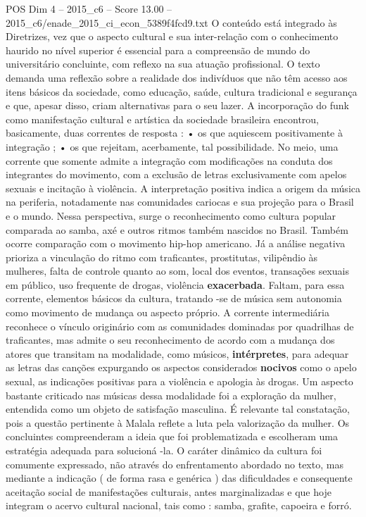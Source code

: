 \begin{textsample}{POS Dim 4 – 2015\_c6 – Score 13.00 – 2015\_c6/enade\_2015\_ci\_econ\_5389f4fcd9.txt}
O conteúdo está integrado às Diretrizes, vez que o aspecto cultural e sua inter-relação com o conhecimento haurido no nível superior é essencial para a compreensão de mundo do universitário concluinte, com reflexo na sua atuação profissional.
O texto demanda uma reflexão sobre a realidade dos indivíduos que não têm acesso aos itens básicos da sociedade, como educação, saúde, cultura tradicional e segurança e que, apesar disso, criam alternativas para o seu lazer.
A incorporação do funk como manifestação cultural e artística da sociedade brasileira encontrou, basicamente, duas correntes de resposta : • os que aquiescem positivamente à integração ; • os que rejeitam, acerbamente, tal possibilidade.
No meio, uma corrente que somente admite a integração com modificações na conduta dos integrantes do movimento, com a exclusão de letras exclusivamente com apelos sexuais e incitação à violência.
A interpretação positiva indica a origem da música na periferia, notadamente nas comunidades cariocas e sua projeção para o Brasil e o mundo.
Nessa perspectiva, surge o reconhecimento como cultura popular comparada ao samba, axé e outros ritmos também nascidos no Brasil.
Também ocorre comparação com o movimento hip-hop americano.
Já a análise negativa prioriza a vinculação do ritmo com traficantes, prostitutas, vilipêndio às mulheres, falta de controle quanto ao som, local dos eventos, transações sexuais em público, uso frequente de drogas, violência \textbf{exacerbada}.
Faltam, para essa corrente, elementos básicos da cultura, tratando -se de música sem autonomia como movimento de mudança ou aspecto próprio.
A corrente intermediária reconhece o vínculo originário com as comunidades dominadas por quadrilhas de traficantes, mas admite o seu reconhecimento de acordo com a mudança dos atores que transitam na modalidade, como músicos, \textbf{intérpretes}, para adequar as letras das canções expurgando os aspectos considerados \textbf{nocivos} como o apelo sexual, as indicações positivas para a violência e apologia às drogas.
Um aspecto bastante criticado nas músicas dessa modalidade foi a exploração da mulher, entendida como um objeto de satisfação masculina.
É relevante tal constatação, pois a questão pertinente à Malala reflete a luta pela valorização da mulher.
Os concluintes compreenderam a ideia que foi problematizada e escolheram uma estratégia adequada para solucioná -la.
O caráter dinâmico da cultura foi comumente expressado, não através do enfrentamento abordado no texto, mas mediante a indicação ( de forma rasa e genérica ) das dificuldades e consequente aceitação social de manifestações culturais, antes marginalizadas e que hoje integram o acervo cultural nacional, tais como : samba, grafite, capoeira e forró.

\end{textsample}
